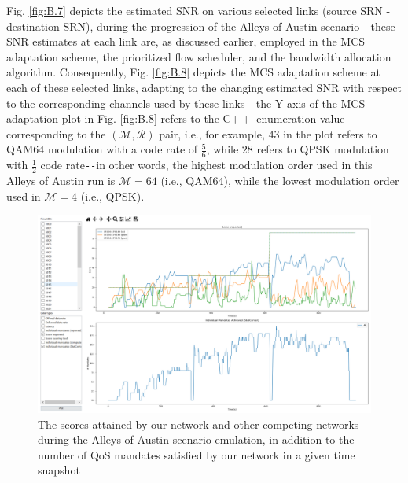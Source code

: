 Fig. \ref{fig:B.7} depicts the estimated SNR on various selected links (source SRN - destination SRN), during the progression of the Alleys of Austin scenario\texttt{-{}-}these SNR estimates at each link are, as discussed earlier, employed in the MCS adaptation scheme, the prioritized flow scheduler, and the bandwidth allocation algorithm. Consequently, Fig. \ref{fig:B.8} depicts the MCS adaptation scheme at each of these selected links, adapting to the changing estimated SNR with respect to the corresponding channels used by these links\texttt{-{}-}the Y-axis of the MCS adaptation plot in Fig. \ref{fig:B.8} refers to the C${++}$ enumeration value corresponding to the $(\mathcal{M},\mathcal{R})$ pair, i.e., for example, $43$ in the plot refers to QAM$64$ modulation with a code rate of $\frac{5}{6}$, while $28$ refers to QPSK modulation with $\frac{1}{2}$ code rate\texttt{-{}-}in other words, the highest modulation order used in this Alleys of Austin run is $\mathcal{M}{=}64$ (i.e., QAM$64$), while the lowest modulation order used in $\mathcal{M}{=}4$ (i.e., QPSK).
\begin{figure} [htb]
    \centerline{
    \includegraphics[width = 1.0\textwidth]{Alleys_Scoring.PNG}}
    \caption{The scores attained by our network and other competing networks during the Alleys of Austin scenario emulation, in addition to the number of QoS mandates satisfied by our network in a given time snapshot}
    \label{fig:B.9}
\end{figure}

